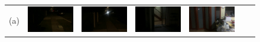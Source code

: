 \documentclass[letterpaper, 10 pt, conference]{ieeeconf}  %
\begin{document}
\begin{figure}
\centering
\begin{tabular*}{\textwidth}{ccccccc}
  (a) &
 \includegraphics[width=\imgW,height=\imgH]{rio-q1} &
 \includegraphics[width=\imgW,height=\imgH]{rio-q2} &
 \includegraphics[width=\imgW,height=\imgH]{rio-q4} &
 \includegraphics[width=\imgW,height=\imgH]{rio-q5} &

\end{tabular*}
\end{figure}
\end{document}
